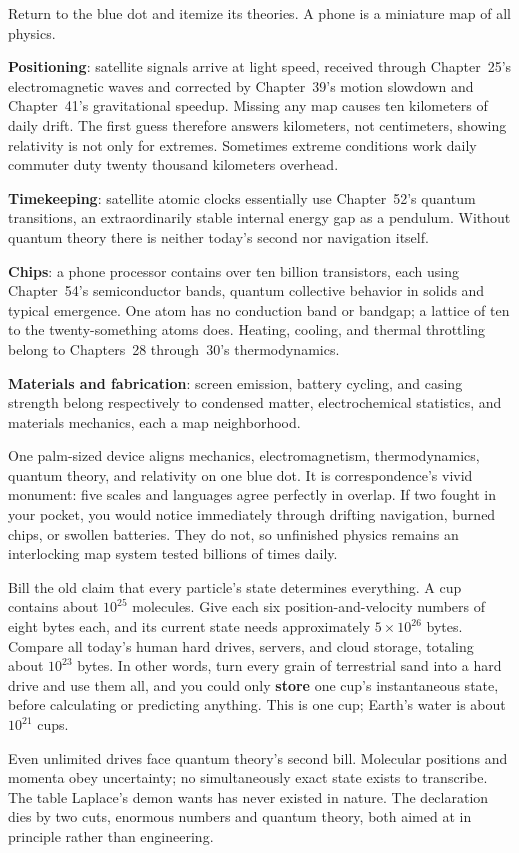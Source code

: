
Return to the blue dot and itemize its theories. A phone is a miniature map of all physics.

\textbf{Positioning}: satellite signals arrive at light speed, received through Chapter~25's electromagnetic waves and corrected by Chapter~39's motion slowdown and Chapter~41's gravitational speedup. Missing any map causes ten kilometers of daily drift. The first guess therefore answers kilometers, not centimeters, showing relativity is not only for extremes. Sometimes extreme conditions work daily commuter duty twenty thousand kilometers overhead.

\textbf{Timekeeping}: satellite atomic clocks essentially use Chapter~52's quantum transitions, an extraordinarily stable internal energy gap as a pendulum. Without quantum theory there is neither today's second nor navigation itself.

\textbf{Chips}: a phone processor contains over ten billion transistors, each using Chapter~54's semiconductor bands, quantum collective behavior in solids and typical emergence. One atom has no conduction band or bandgap; a lattice of ten to the twenty-something atoms does. Heating, cooling, and thermal throttling belong to Chapters~28 through~30's thermodynamics.

\textbf{Materials and fabrication}: screen emission, battery cycling, and casing strength belong respectively to condensed matter, electrochemical statistics, and materials mechanics, each a map neighborhood.

One palm-sized device aligns mechanics, electromagnetism, thermodynamics, quantum theory, and relativity on one blue dot. It is correspondence's vivid monument: five scales and languages agree perfectly in overlap. If two fought in your pocket, you would notice immediately through drifting navigation, burned chips, or swollen batteries. They do not, so unfinished physics remains an interlocking map system tested billions of times daily.


\begin{thought}
Bill the old claim that every particle's state determines everything. A cup contains about $10^{25}$ molecules. Give each six position-and-velocity numbers of eight bytes each, and its current state needs approximately $5\times10^{26}$ bytes. Compare all today's human hard drives, servers, and cloud storage, totaling about $10^{23}$ bytes. In other words, turn every grain of terrestrial sand into a hard drive and use them all, and you could only \textbf{store} one cup's instantaneous state, before calculating or predicting anything. This is one cup; Earth's water is about $10^{21}$ cups.

Even unlimited drives face quantum theory's second bill. Molecular positions and momenta obey uncertainty; no simultaneously exact state exists to transcribe. The table Laplace's demon wants has never existed in nature. The declaration dies by two cuts, enormous numbers and quantum theory, both aimed at in principle rather than engineering.
\end{thought}

